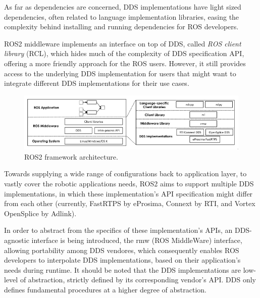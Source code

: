 As far as dependencies are concerned, DDS implementations have light sized dependencies, often related to language implementation libraries, easing the complexity behind installing and running dependencies for ROS developers. \cite{ros-on-dds}

ROS2 middleware implements an interface on top of DDS, called \textit{ROS client library} (RCL), which hides much of the complexity of DDS specification API, offering a more friendly approach for the ROS users. However, it still provides access to the underlying DDS implementation for users that might want to integrate different DDS implementations for their use cases.

\begin{figure}[H]
    \centering
    \includegraphics[width=\linewidth]{images/ros2-architecture.png}
    \caption{ROS2 framework architecture.}
    \label{fig:ros2-architecture}
\end{figure}

Towards supplying a wide range of configurations back to application layer, to vastly cover the robotic applications needs, ROS2 aims to support multiple DDS implementations, in which these implementation's API specification might differ from each other (currently, FastRTPS by eProsima, Connext by RTI, and Vortex OpenSplice by Adlink). 

In order to abstract from the specifics of these implementation's APIs, an DDS-agnostic interface is being introduced, the rmw (ROS MiddleWare) interface, allowing portability among DDS vendores, which consequently enables ROS developers to interpolate DDS implementations, based on their application's needs during runtime. It should be noted that the DDS implementations are low-level of abstraction, strictly defined by its corresponding vendor's API. DDS only defines fundamental procedures at a higher degree of abstraction.  


